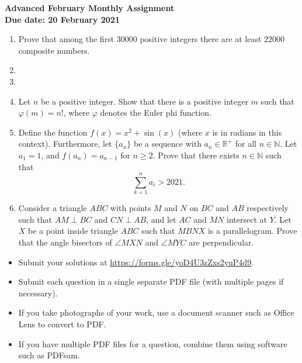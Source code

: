 \documentclass{article}
\begin{document}
\thispagestyle{empty}

\begin{center}
  \textbf{\Large Advanced February Monthly Assignment}
  \\ \vspace{1em}
  \textbf{\large Due date: 20 February 2021}
\end{center}

\vspace{12pt}

\begin{enumerate}[1.]

\item %
Prove that among the first $30000$ positive integers there are at least $22000$ composite numbers.


\item %


\item %


\item %
Let $n$ be a positive integer. Show that there is a positive integer $m$ such that $\varphi(m) = n!$, where $\varphi$ denotes the Euler phi function.


\item %
Define the function $f(x) = x^2 + \sin(x)$ (where $x$ is in radians in this context). Furthermore, let $\{a_n\}$ be a sequence with $a_n \in \mathbb{R}^+$ for all $n \in \mathbb{N}$. Let $a_1 = 1$, and $f(a_n) = a_{n - 1}$ for $n \ge 2$. Prove that there exists $n \in \mathbb{N}$ such that 
$$\sum_{k = 1}^n a_i > 2021.$$


\item %
Consider a triangle $ABC$ with points $M$ and $N$ on $BC$ and $AB$ respectively such that $AM \perp BC$ and $CN \perp AB$, and let $AC$ and $MN$ intersect at $Y$.
Let $X$ be a point inside triangle $ABC$ such that $MBNX$ is a parallelogram.
Prove that the angle bisectors of $\angle MXN$ and $\angle MYC$ are perpendicular.


\end{enumerate}


\vfill
\begin{itemize}
	\item Submit your solutions at \url{https://forms.gle/yoD4U3zZxs2yuP4d9}.
	\item Submit each question in a single separate PDF file (with multiple pages if necessary).
	\item If you take photographs of your work, use a document scanner such as Office Lens to convert to PDF.
	\item If you have multiple PDF files for a question, combine them using software such as PDFsam.
\end{itemize}
\end{document}
